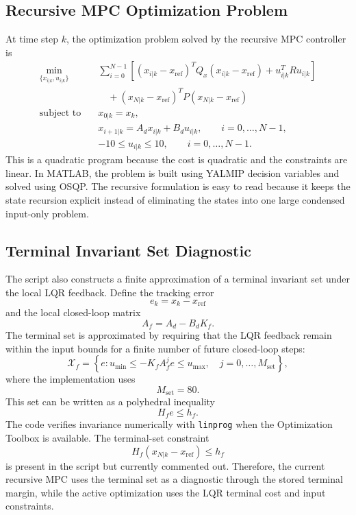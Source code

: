\documentclass[conference]{IEEEtran}
\begin{document}
\subsection{Recursive MPC Optimization Problem}
At time step $k$, the optimization problem solved by the recursive MPC controller is
\begin{align}
\min_{\{x_{i|k},u_{i|k}\}} \quad
&
\sum_{i=0}^{N-1}
\left[
(x_{i|k}-x_{\mathrm{ref}})^T Q_x (x_{i|k}-x_{\mathrm{ref}})
+ u_{i|k}^T R u_{i|k}
\right]
\nonumber\\
&\quad
+ (x_{N|k}-x_{\mathrm{ref}})^T P (x_{N|k}-x_{\mathrm{ref}})
\label{eq:recursive_mpc_objective}
\\
\text{subject to} \quad
& x_{0|k}=x_k,
\label{eq:mpc_initial_condition}\\
& x_{i+1|k}=A_d x_{i|k}+B_d u_{i|k},
\qquad i=0,\ldots,N-1,
\label{eq:mpc_dynamics}\\
& -10 \le u_{i|k} \le 10,
\qquad i=0,\ldots,N-1.
\label{eq:mpc_input_constraint}
\end{align}
This is a quadratic program because the cost is quadratic and the constraints are linear. In MATLAB, the problem is built using YALMIP decision variables and solved using OSQP. The recursive formulation is easy to read because it keeps the state recursion explicit instead of eliminating the states into one large condensed input-only problem.

\subsection{Terminal Invariant Set Diagnostic}
The script also constructs a finite approximation of a terminal invariant set under the local LQR feedback. Define the tracking error
\[
e_k = x_k-x_{\mathrm{ref}}
\]
and the local closed-loop matrix
\[
A_f = A_d-B_dK_f.
\]
The terminal set is approximated by requiring that the LQR feedback remain within the input bounds for a finite number of future closed-loop steps:
\[
\mathcal{X}_f =
\left\{
e :
u_{\min}
\le
-K_f A_f^j e
\le
u_{\max},
\quad j=0,\ldots,M_{\mathrm{set}}
\right\},
\]
where the implementation uses
\[
M_{\mathrm{set}}=80.
\]
This set can be written as a polyhedral inequality
\[
H_f e \le h_f.
\]
The code verifies invariance numerically with \texttt{linprog} when the Optimization Toolbox is available. The terminal-set constraint
\[
H_f(x_{N|k}-x_{\mathrm{ref}})\le h_f
\]
is present in the script but currently commented out. Therefore, the current recursive MPC uses the terminal set as a diagnostic through the stored terminal margin, while the active optimization uses the LQR terminal cost and input constraints.
\end{document}
